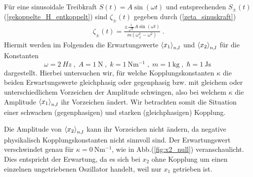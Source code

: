     Für eine sinusoidale Treibkraft $S(t)=A\sin(\omega t)$ und entsprechenden $S_\pm(t)$ (\ref{gekoppelte_H_entkoppelt}) sind $\zeta_\pm(t)$ gegeben durch (\ref{zeta_sinuskraft})
    \begin{align}
      \zeta_\pm(t) = \frac{\pm\frac{1}{\sqrt 2} A\sin(\omega t)}{m(\omega_\pm^2 - \omega^2)} \; .
    \end{align}
    Hiermit werden im Folgenden die Erwartungswerte $\braket{x_1}_{n,l}$ und $\braket{x_2}_{n,l}$ für die Konstanten
    \begin{equation}
      \omega=\SI{2}{Hz} \;,\; A=\SI{1}{\newton} \;,\; k=\SI{1}{\newton \meter^{-1}} \;,\; m=\SI{1}{\kilo \gram} \;,\; \hbar=\SI{1}{\joule \second} \;
    \end{equation}
    dargestellt.
    Hierbei untersuchen wir, für welche Kopplungskonstanten $\kappa$ die beiden Erwartungswerte gleichphasig oder gegenphasig bzw. mit gleichem oder unterschiedlichem Vorzeichen der Amplitude schwingen, also bei welchem $\kappa$ die Amplitude $\braket{x_1}_{n,l}$ ihr Vorzeichen ändert.
    Wir betrachten somit die Situation einer schwachen (gegenphasigen) und starken (gleichphasigen) Kopplung.

    Die Amplitude von $\braket{x_2}_{n,l}$ kann ihr Vorzeichen nicht ändern, da negative physikalisch Kopplungskonstanten nicht sinnvoll sind. Der Erwartungswert verschwindet genau für $\kappa=\SI{0}{\newton \meter^{-1}}$, wie in Abb.(\ref{fig:x2_null}) veranschaulicht.
    Dies entspricht der Erwartung, da es sich bei $x_2$ ohne Kopplung um einen einzelnen ungetriebenen Oszillator handelt, weil nur $x_1$ getrieben ist.

